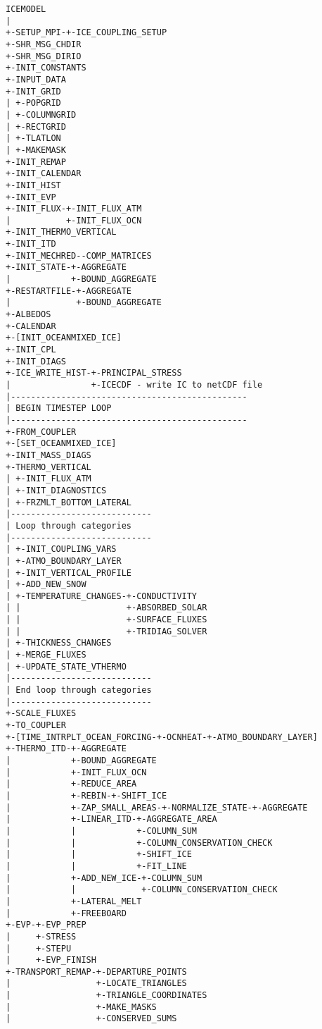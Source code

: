 
{\scriptsize
\begin{verbatim}
ICEMODEL
|
+-SETUP_MPI-+-ICE_COUPLING_SETUP
+-SHR_MSG_CHDIR 
+-SHR_MSG_DIRIO 
+-INIT_CONSTANTS
+-INPUT_DATA
+-INIT_GRID
| +-POPGRID
| +-COLUMNGRID
| +-RECTGRID
| +-TLATLON
| +-MAKEMASK
+-INIT_REMAP
+-INIT_CALENDAR
+-INIT_HIST
+-INIT_EVP
+-INIT_FLUX-+-INIT_FLUX_ATM
|           +-INIT_FLUX_OCN
+-INIT_THERMO_VERTICAL
+-INIT_ITD
+-INIT_MECHRED--COMP_MATRICES
+-INIT_STATE-+-AGGREGATE
|            +-BOUND_AGGREGATE
+-RESTARTFILE-+-AGGREGATE
|             +-BOUND_AGGREGATE
+-ALBEDOS
+-CALENDAR
+-[INIT_OCEANMIXED_ICE]
+-INIT_CPL
+-INIT_DIAGS
+-ICE_WRITE_HIST-+-PRINCIPAL_STRESS
|                +-ICECDF - write IC to netCDF file
|-----------------------------------------------
| BEGIN TIMESTEP LOOP
|-----------------------------------------------
+-FROM_COUPLER
+-[SET_OCEANMIXED_ICE]
+-INIT_MASS_DIAGS
+-THERMO_VERTICAL
| +-INIT_FLUX_ATM
| +-INIT_DIAGNOSTICS
| +-FRZMLT_BOTTOM_LATERAL
|----------------------------
| Loop through categories
|----------------------------
| +-INIT_COUPLING_VARS
| +-ATMO_BOUNDARY_LAYER
| +-INIT_VERTICAL_PROFILE
| +-ADD_NEW_SNOW
| +-TEMPERATURE_CHANGES-+-CONDUCTIVITY
| |                     +-ABSORBED_SOLAR
| |                     +-SURFACE_FLUXES
| |                     +-TRIDIAG_SOLVER
| +-THICKNESS_CHANGES
| +-MERGE_FLUXES
| +-UPDATE_STATE_VTHERMO
|----------------------------
| End loop through categories
|----------------------------
+-SCALE_FLUXES
+-TO_COUPLER
+-[TIME_INTRPLT_OCEAN_FORCING-+-OCNHEAT-+-ATMO_BOUNDARY_LAYER]
+-THERMO_ITD-+-AGGREGATE
|            +-BOUND_AGGREGATE
|            +-INIT_FLUX_OCN
|            +-REDUCE_AREA
|            +-REBIN-+-SHIFT_ICE
|            +-ZAP_SMALL_AREAS-+-NORMALIZE_STATE-+-AGGREGATE
|            +-LINEAR_ITD-+-AGGREGATE_AREA
|            |            +-COLUMN_SUM
|            |            +-COLUMN_CONSERVATION_CHECK
|            |            +-SHIFT_ICE
|            |            +-FIT_LINE
|            +-ADD_NEW_ICE-+-COLUMN_SUM
|            |             +-COLUMN_CONSERVATION_CHECK
|            +-LATERAL_MELT
|            +-FREEBOARD
+-EVP-+-EVP_PREP
|     +-STRESS
|     +-STEPU
|     +-EVP_FINISH
+-TRANSPORT_REMAP-+-DEPARTURE_POINTS
|                 +-LOCATE_TRIANGLES
|                 +-TRIANGLE_COORDINATES
|                 +-MAKE_MASKS
|                 +-CONSERVED_SUMS

\end{verbatim}}
